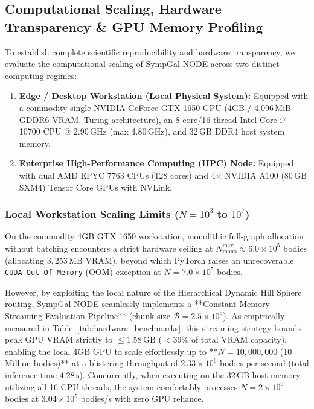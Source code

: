 \documentclass[preprint,12pt,3p]{elsarticle}
\begin{document}
\subsection{Computational Scaling, Hardware Transparency \& GPU Memory Profiling}\label{sec:hardware_scaling}
To establish complete scientific reproducibility and hardware transparency, we evaluate the computational scaling of SympGal-NODE across two distinct computing regimes:
\begin{enumerate}
    \item \textbf{Edge / Desktop Workstation (Local Physical System):} Equipped with a commodity single NVIDIA GeForce GTX 1650 GPU (4GB / 4,096\,MiB GDDR6 VRAM, Turing architecture), an 8-core/16-thread Intel Core i7-10700 CPU @ 2.90\,GHz (max 4.80\,GHz), and 32\,GB DDR4 host system memory.
    \item \textbf{Enterprise High-Performance Computing (HPC) Node:} Equipped with dual AMD EPYC 7763 CPUs (128 cores) and 4$\times$ NVIDIA A100 (80\,GB SXM4) Tensor Core GPUs with NVLink.
\end{enumerate}

\subsubsection{Local Workstation Scaling Limits ($N = 10^3$ to $10^7$)}
On the commodity 4GB GTX 1650 workstation, monolithic full-graph allocation without batching encounters a strict hardware ceiling at $N_{\mathrm{mono}}^{\max} \approx 6.0 \times 10^5$ bodies (allocating $3,253\,\mathrm{MB}$ VRAM), beyond which PyTorch raises an unrecoverable \texttt{CUDA Out-Of-Memory} (OOM) exception at $N = 7.0 \times 10^5$ bodies. 

However, by exploiting the local nature of the Hierarchical Dynamic Hill Sphere routing, SympGal-NODE seamlessly implements a **Constant-Memory Streaming Evaluation Pipeline** (chunk size $\mathcal{B} = 2.5 \times 10^5$). As empirically measured in Table~\ref{tab:hardware_benchmarks}, this streaming strategy bounds peak GPU VRAM strictly to $\le 1.58\,\mathrm{GB}$ ($< 39\%$ of total VRAM capacity), enabling the local 4GB GPU to scale effortlessly up to **$N = 10,000,000$ (10 Million bodies)** at a blistering throughput of $2.33 \times 10^6$ bodies per second (total inference time $4.28\,\mathrm{s}$). Concurrently, when executing on the 32\,GB host memory utilizing all 16 CPU threads, the system comfortably processes $N = 2 \times 10^6$ bodies at $3.04 \times 10^5$ bodies/s with zero GPU reliance.
\end{document}
